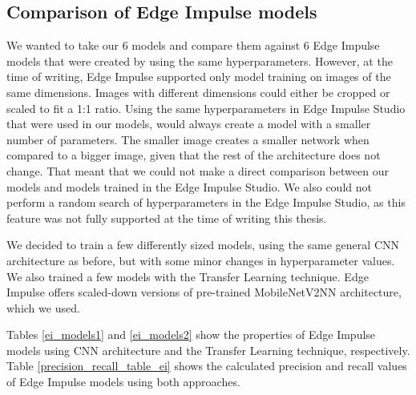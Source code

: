 \subsection{ Comparison of Edge Impulse models}

We wanted to take our 6 models and compare them against 6 Edge Impulse models that were created by using the same hyperparameters.
However, at the time of writing, Edge Impulse supported only model training on images of the same dimensions.
Images with different dimensions could either be cropped or scaled to fit a 1:1 ratio.
Using the same hyperparameters in Edge Impulse Studio that were used in our models, would always create a model with a smaller number of parameters.
The smaller image creates a smaller network when compared to a bigger image, given that the rest of the architecture does not change.
That meant that we could not make a direct comparison between our models and models trained in the Edge Impulse Studio.
We also could not perform a random search of hyperparameters in the Edge Impulse Studio, as this feature was not fully supported at the time of writing this thesis.

We decided to train a few differently sized models, using the same general CNN architecture as before, but with some minor changes in hyperparameter values.
We also trained a few models with the Transfer Learning technique.
Edge Impulse offers scaled-down versions of pre-trained MobileNetV2\footnotemark NN architecture, which we used.

Tables \ref{ei_models1} and \ref{ei_models2} show the properties of Edge Impulse models using CNN architecture and the Transfer Learning technique, respectively. 
Table \ref{precision_recall_table_ei} shows the calculated precision and recall values of Edge Impulse models using both approaches.

